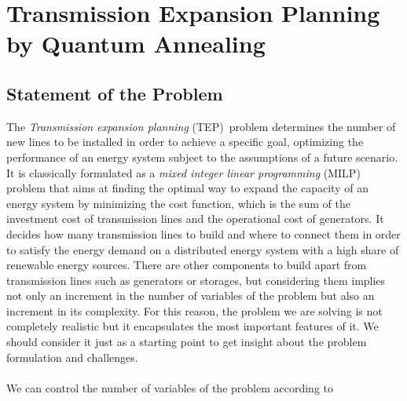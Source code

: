 \chapter{Transmission Expansion Planning by Quantum Annealing} %
\label{Chapter4} %
\section{Statement of the Problem}
The \textit{Transmission expansion planning} (TEP)\,\cite{Neumann2020TransmissionFlows} problem determines the number of new lines to be installed in order to achieve a specific goal, optimizing the performance of an energy system subject to the assumptions of a future scenario. It is classically formulated as a \textit{mixed integer linear programming} (MILP) problem that aims at finding the optimal way to expand the capacity of an energy system by minimizing the cost function, which is the sum of the investment cost of transmission lines and the operational cost of generators. It decides how many transmission lines to build and where to connect them in order to satisfy the energy demand on a distributed energy system with a high share of renewable energy sources. There are other components to build apart from transmission lines such as generators or storages, but considering them implies not only an increment in the number of variables of the problem but also an increment in its complexity. For this reason, the problem we are solving is not completely realistic but it encapsulates the most important features of it. We should consider it just as a starting point to get insight about the problem formulation and challenges.\\\\
We can control the number of variables of the problem according to
